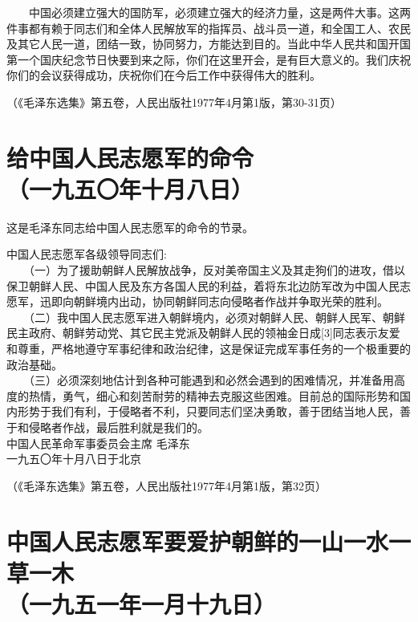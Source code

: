 \documentclass[cn,11pt,chinese]{elegantbook}
\def\myformat#1{\hfil\hfil #1}
\begin{document}
　　中国必须建立强大的国防军，必须建立强大的经济力量，这是两件大事。这两件事都有赖于同志们和全体人民解放军的指挥员、战斗员一道，和全国工人、农民及其它人民一道，团结一致，协同努力，方能达到目的。当此中华人民共和国开国第一个国庆纪念节日快要到来之际，你们在这里开会，是有巨大意义的。我们庆祝你们的会议获得成功，庆祝你们在今后工作中获得伟大的胜利。\\
\begin{flushright}（《毛泽东选集》第五卷，人民出版社1977年4月第1版，第30-31页）\end{flushright}
\newpage\section*{\myformat{给中国人民志愿军的命令}\\\myformat{（一九五〇年十月八日）}}
\begin{introduction}\item  这是毛泽东同志给中国人民志愿军的命令的节录。\end{introduction}
中国人民志愿军各级领导同志们:\\
　　（一）为了援助朝鲜人民解放战争，反对美帝国主义及其走狗们的进攻，借以保卫朝鲜人民、中国人民及东方各国人民的利益，着将东北边防军改为中国人民志愿军，迅即向朝鲜境内出动，协同朝鲜同志向侵略者作战并争取光荣的胜利。\\
　　（二）我中国人民志愿军进入朝鲜境内，必须对朝鲜人民、朝鲜人民军、朝鲜民主政府、朝鲜劳动党、其它民主党派及朝鲜人民的领袖金日成[3]同志表示友爱和尊重，严格地遵守军事纪律和政治纪律，这是保证完成军事任务的一个极重要的政治基础。\\
　　（三）必须深刻地估计到各种可能遇到和必然会遇到的困难情况，并准备用高度的热情，勇气，细心和刻苦耐劳的精神去克服这些困难。目前总的国际形势和国内形势于我们有利，于侵略者不利，只要同志们坚决勇敢，善于团结当地人民，善于和侵略者作战，最后胜利就是我们的。\\
中国人民革命军事委员会主席 毛泽东\\
一九五〇年十月八日于北京　\\
\begin{flushright}（《毛泽东选集》第五卷，人民出版社1977年4月第1版，第32页）\end{flushright}
\newpage\section*{\myformat{中国人民志愿军要爱护朝鲜的一山一水一草一木}\\\myformat{（一九五一年一月十九日）}}
\end{document}

